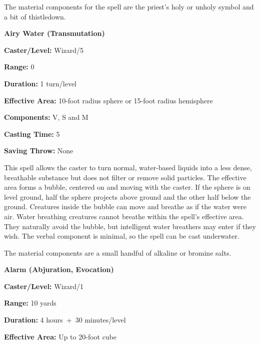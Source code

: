 \begin{multicols}{2}
The material components for the spell are the priest's holy or unholy symbol and a bit of thistledown.

\vspace{1em}
 
\noindent
\begin{minipage}{\columnwidth}

\noindent \textbf{Airy Water (Transmutation)}

\noindent \textbf{Caster/Level:} Wizard/5

\noindent \textbf{Range:} 0

\noindent \textbf{Duration:} 1 turn/level

\noindent \textbf{Effective Area:} 10-foot radius sphere or 15-foot radius hemisphere

\noindent \textbf{Components:} V, S and M

\noindent \textbf{Casting Time:} 5

\noindent \textbf{Saving Throw:} None

\end{minipage}

This spell allows the caster to turn normal, water-based liquids into a less dense, breathable substance but does not filter or remove solid particles.  The effective area forms a bubble, centered on and moving with the caster.  If the sphere is on level ground, half the sphere projects above ground and the other half below the ground.  Creatures inside the bubble can move and breathe as if the water were air.  Water breathing creatures cannot breathe within the spell's effective area.  They naturally avoid the bubble, but intelligent water breathers may enter if they wish.  The verbal component is minimal, so the spell can be cast underwater.

The material components are a small handful of alkaline or bromine salts.

\vspace{1em}

\noindent
\begin{minipage}{\columnwidth}

\noindent \textbf{Alarm (Abjuration, Evocation)}

\noindent \textbf{Caster/Level:} Wizard/1

\noindent \textbf{Range:} 10 yards

\noindent \textbf{Duration:} 4 hours~+~30 minutes/level

\noindent \textbf{Effective Area:} Up to 20-foot cube


\end{minipage}
\end{multicols}
